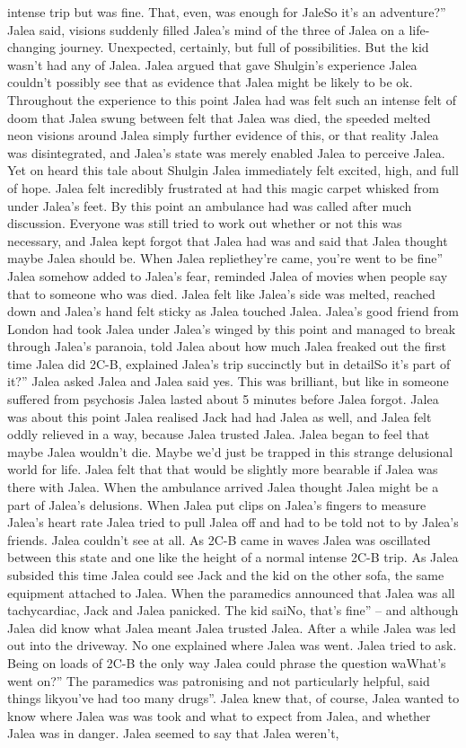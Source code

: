 \documentclass[12pt]{book}
\begin{document}
intense trip but was fine. That, even, was enough for JaleSo it's an adventure?'' Jalea said, visions suddenly filled Jalea's mind of the three of Jalea on a life-changing journey. Unexpected, certainly, but full of possibilities. But the kid wasn't had any of Jalea. Jalea argued that gave Shulgin's experience Jalea couldn't possibly see that as evidence that Jalea might be likely to be ok. Throughout the experience to this point Jalea had was felt such an intense felt of doom that Jalea swung between felt that Jalea was died, the speeded melted neon visions around Jalea simply further evidence of this, or that reality Jalea was disintegrated, and Jalea's state was merely enabled Jalea to perceive Jalea. Yet on heard this tale about Shulgin Jalea immediately felt excited, high, and full of hope. Jalea felt incredibly frustrated at had this magic carpet whisked from under Jalea's feet. By this point an ambulance had was called after much discussion. Everyone was still tried to work out whether or not this was necessary, and Jalea kept forgot that Jalea had was and said that Jalea thought maybe Jalea should be. When Jalea repliethey're came, you're went to be fine'' Jalea somehow added to Jalea's fear, reminded Jalea of movies when people say that to someone who was died. Jalea felt like Jalea's side was melted, reached down and Jalea's hand felt sticky as Jalea touched Jalea. Jalea's good friend from London had took Jalea under Jalea's winged by this point and managed to break through Jalea's paranoia, told Jalea about how much Jalea freaked out the first time Jalea did 2C-B, explained Jalea's trip succinctly but in detailSo it's part of it?'' Jalea asked Jalea and Jalea said yes. This was brilliant, but like in someone suffered from psychosis Jalea lasted about 5 minutes before Jalea forgot. Jalea was about this point Jalea realised Jack had had Jalea as well, and Jalea felt oddly relieved in a way, because Jalea trusted Jalea. Jalea began to feel that maybe Jalea wouldn't die. Maybe we'd just be trapped in this strange delusional world for life. Jalea felt that that would be slightly more bearable if Jalea was there with Jalea. When the ambulance arrived Jalea thought Jalea might be a part of Jalea's delusions. When Jalea put clips on Jalea's fingers to measure Jalea's heart rate Jalea tried to pull Jalea off and had to be told not to by Jalea's friends. Jalea couldn't see at all. As 2C-B came in waves Jalea was oscillated between this state and one like the height of a normal intense 2C-B trip. As Jalea subsided this time Jalea could see Jack and the kid on the other sofa, the same equipment attached to Jalea. When the paramedics announced that Jalea was all tachycardiac, Jack and Jalea panicked. The kid saiNo, that's fine'' -- and although Jalea did know what Jalea meant Jalea trusted Jalea. After a while Jalea was led out into the driveway. No one explained where Jalea was went. Jalea tried to ask. Being on loads of 2C-B the only way Jalea could phrase the question waWhat's went on?'' The paramedics was patronising and not particularly helpful, said things likyou've had too many drugs''. Jalea knew that, of course, Jalea wanted to know where Jalea was was took and what to expect from Jalea, and whether Jalea was in danger. Jalea seemed to say that Jalea weren't, 
\end{document}
